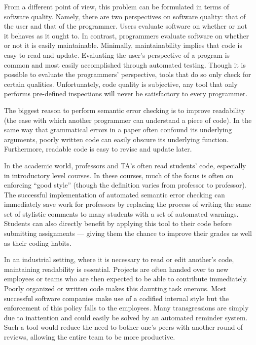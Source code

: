 \documentclass[12pt]{report}
\begin{document}
From a different point of view, this problem can be formulated in terms of software quality. 
Namely, there are two perspectives on software quality: that of the user and that of the programmer. 
Users evaluate software on whether or not it behaves as it ought to. In contrast, programmers evaluate 
software on whether or not it is easily maintainable. Minimally, maintainability implies that 
code is easy to read and update. Evaluating the user's perspective of a program is common and most 
easily accomplished through automated testing. Though it is possible to evaluate the programmers' 
perspective, tools that do so only check for certain qualities. Unfortunately, code quality is 
subjective, any tool that only performs pre-defined inspections will never be satisfactory to every 
programmer.

The biggest reason to perform semantic error checking is to improve readability (the 
ease with which another programmer can understand a piece of code). In the same way that 
grammatical errors in a paper often confound its underlying arguments, poorly written code can easily 
obscure its underlying function. Furthermore, readable code is easy to revise and update later. 

In the academic world, professors and TA's often read students' code, especially in introductory level
courses. In these courses, much of the focus is often on enforcing ``good style'' (though the definition 
varies from professor to professor).  The successful implementation of automated semantic error 
checking can immediately save work for professors by replacing the process of writing the same set of 
stylistic comments to many students with a set of automated warnings. Students can also directly 
benefit by applying this tool to their code before submitting assignments --- giving them the chance to 
improve their grades as well as their coding habits.

In an industrial setting, where it is necessary to read or edit another's code, maintaining readability is 
essential. Projects are often handed over to new employees or teams who are then expected to be 
able to contribute immediately. Poorly organized or written code makes this daunting task 
onerous. Most successful software companies make use of a codified internal style but the 
enforcement of this policy falls to the employees. Many transgressions are simply due to inattention 
and could easily be solved by an automated reminder system. Such a tool would reduce the need to 
bother one's peers with another round of reviews, allowing the entire team to be more productive. 
\end{document}
